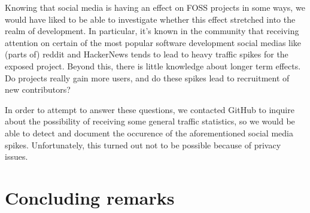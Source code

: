 \documentclass[a4paper,11pt]{article} %
\begin{document}
Knowing that social media is having an effect on FOSS projects in some
ways, we would have liked to be able to investigate whether this
effect stretched into the realm of development. In particular, it's
known in the community that receiving attention on certain of the most
popular software development social medias like (parts of) reddit and
HackerNews tends to lead to heavy traffic spikes for the exposed
project. Beyond this, there is little knowledge about longer term
effects. Do projects really gain more users, and do these spikes lead
to recruitment of new contributors?

In order to attempt to answer these questions, we contacted GitHub to
inquire about the possibility of receiving some general traffic
statistics, so we would be able to detect and document the occurence
of the aforementioned social media spikes. Unfortunately, this turned
out not to be possible because of privacy issues.

\section{Concluding remarks}

\printbibliography
 
\end{document}
